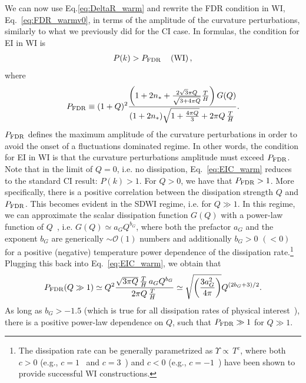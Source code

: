 \documentclass[a4paper,11pt]{article}
\begin{document}
 We can now use Eq.\eqref{eq:DeltaR_warm} and rewrite the FDR condition in WI, Eq.~\eqref{eq:FDR_warmv0}, in terms of the amplitude of the curvature perturbations, similarly to what we previously did for the CI case. In formulas, the condition for EI in WI is
%
\begin{eqnarray}
    P(k)> P_{\rm{FDR}} \,\,\,\,\,\,\,   ({\rm 
 WI}) \, ,\label{eq:EIC_warm}
\end{eqnarray}
where
\begin{eqnarray}
    P_{\rm{FDR}}\equiv (1+Q)^2\frac{\left(1 + 2 n_{*}+\frac{2 \sqrt{3}
        \pi Q}{\sqrt{3+4 \pi Q}}
      \frac{T}{H}\right)G(Q)}{(1+2n_*)\sqrt{1+\frac{4\pi Q}{3}}+2\pi Q\,\frac{T}{H}\, }. \label{eq:P_FDR}
\end{eqnarray}
$P_{\rm{FDR}}$ defines the maximum amplitude of the curvature perturbations in order to avoid the onset of a fluctuations dominated regime. In other words, the condition for EI in WI is that the curvature perturbations amplitude must
exceed $P_{\rm{FDR}}$. 
Note that in the limit of $Q=0$, i.e. no dissipation,
Eq.~\eqref{eq:EIC_warm} reduces to the standard CI result: $P(k)>1$. For $Q>0$, we have that $P_{\rm{FDR}}>1$. More specifically, there
is a positive correlation between the dissipation strength $Q$ and
$P_{\rm{FDR}}$. This becomes evident in the SDWI regime, i.e. for
$Q\gg 1$. In this regime, we can approximate the scalar dissipation
function  $G(Q)$ with a power-law function of
$Q$~\cite{Montefalcone:2023pvh}, i.e.  $G(Q)\simeq a_G Q^{b_G}$, where both
the prefactor $a_G$ and the exponent $b_G$ are generically $\sim \mathcal{O}(1)$ numbers and additionally $b_G>0$ $(<0)$ for a positive (negative) temperature power
dependence of the dissipation rate.\footnote{The dissipation rate can be
generally parametrized as $\Upsilon\propto\,T^c$, where both $c>0$ (e.g.,
$c=1$~\cite{Bastero-Gil:2016qru} and $c=3$~\cite{Moss:2006gt}) and
$c<0$ (e.g., $c=-1$~\cite{Bastero-Gil:2019gao}) have been shown to
provide successful WI constructions.} Plugging this back into
Eq.~\eqref{eq:EIC_warm}, we obtain that
%
\begin{equation}
    P_{\rm{FDR}}(Q\gg 1)\simeq Q^2\frac{\sqrt{3\pi
        Q}\,\frac{T}{H}\,a_G Q^{b_G}}{2\pi Q
     \,\frac{T}{H}\,}  \simeq
    \sqrt{\left(\frac{3a_G^2}{4\pi}\right)}Q^{(2b_G+3)/2}.
    \label{eq:EIC_SDwarm}
\end{equation}
%
As long as $b_G>-1.5$ (which is true for all dissipation rates of
physical interest~\cite{Montefalcone:2023pvh}), there is a positive
power-law dependence on $Q$, such that $P_{\rm{FDR}}\gg1$ for $Q\gg
1$.
\end{document}
